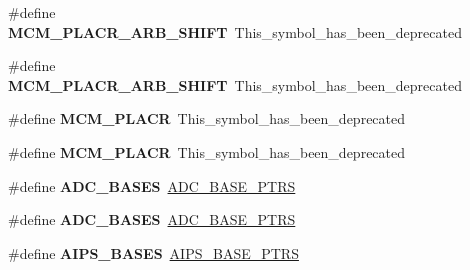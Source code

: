 \begin{DoxyCompactItemize}
\item 
\#define {\bfseries M\+C\+M\+\_\+\+P\+L\+A\+C\+R\+\_\+\+A\+R\+B\+\_\+\+S\+H\+I\+FT}~This\+\_\+symbol\+\_\+has\+\_\+been\+\_\+deprecated\hypertarget{group__Backward__Compatibility__Symbols_ga074aa7cf18e97a20994af9c9f1151873}{}\label{group__Backward__Compatibility__Symbols_ga074aa7cf18e97a20994af9c9f1151873}

\item 
\#define {\bfseries M\+C\+M\+\_\+\+P\+L\+A\+C\+R\+\_\+\+A\+R\+B\+\_\+\+S\+H\+I\+FT}~This\+\_\+symbol\+\_\+has\+\_\+been\+\_\+deprecated\hypertarget{group__Backward__Compatibility__Symbols_ga074aa7cf18e97a20994af9c9f1151873}{}\label{group__Backward__Compatibility__Symbols_ga074aa7cf18e97a20994af9c9f1151873}

\item 
\#define {\bfseries M\+C\+M\+\_\+\+P\+L\+A\+CR}~This\+\_\+symbol\+\_\+has\+\_\+been\+\_\+deprecated\hypertarget{group__Backward__Compatibility__Symbols_gaa410b4b505027d7ff0aab20f87e2c2a5}{}\label{group__Backward__Compatibility__Symbols_gaa410b4b505027d7ff0aab20f87e2c2a5}

\item 
\#define {\bfseries M\+C\+M\+\_\+\+P\+L\+A\+CR}~This\+\_\+symbol\+\_\+has\+\_\+been\+\_\+deprecated\hypertarget{group__Backward__Compatibility__Symbols_gaa410b4b505027d7ff0aab20f87e2c2a5}{}\label{group__Backward__Compatibility__Symbols_gaa410b4b505027d7ff0aab20f87e2c2a5}

\item 
\#define {\bfseries A\+D\+C\+\_\+\+B\+A\+S\+ES}~\hyperlink{group__ADC__Peripheral__Access__Layer_gaaa8175a3a2f4efaceeed5bd26c0b2d3f}{A\+D\+C\+\_\+\+B\+A\+S\+E\+\_\+\+P\+T\+RS}\hypertarget{group__Backward__Compatibility__Symbols_gae0bfd3c32654e1c2ef2188474f7d7d07}{}\label{group__Backward__Compatibility__Symbols_gae0bfd3c32654e1c2ef2188474f7d7d07}

\item 
\#define {\bfseries A\+D\+C\+\_\+\+B\+A\+S\+ES}~\hyperlink{group__ADC__Peripheral__Access__Layer_gaaa8175a3a2f4efaceeed5bd26c0b2d3f}{A\+D\+C\+\_\+\+B\+A\+S\+E\+\_\+\+P\+T\+RS}\hypertarget{group__Backward__Compatibility__Symbols_gae0bfd3c32654e1c2ef2188474f7d7d07}{}\label{group__Backward__Compatibility__Symbols_gae0bfd3c32654e1c2ef2188474f7d7d07}

\item 
\#define {\bfseries A\+I\+P\+S\+\_\+\+B\+A\+S\+ES}~\hyperlink{group__AIPS__Peripheral__Access__Layer_gacdda032ccd174e1d8c1a02b1e0f7a441}{A\+I\+P\+S\+\_\+\+B\+A\+S\+E\+\_\+\+P\+T\+RS}\hypertarget{group__Backward__Compatibility__Symbols_ga9649eb4cdd717b712c299e178d54cfd6}{}\label{group__Backward__Compatibility__Symbols_ga9649eb4cdd717b712c299e178d54cfd6}


\end{DoxyCompactItemize}
